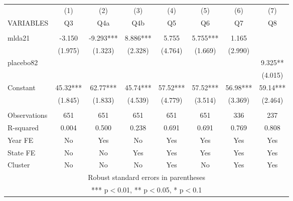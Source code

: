 \documentclass[]{article}
\begin{document}
\begin{tabular}{lccccccc} \hline
 & (1) & (2) & (3) & (4) & (5) & (6) & (7) \\
VARIABLES & Q3 & Q4a & Q4b & Q5 & Q6 & Q7 & Q8 \\ \hline
 &  &  &  &  &  &  &  \\
mlda21 & -3.150 & -9.293*** & 8.886*** & 5.755 & 5.755*** & 1.165 &  \\
 & (1.975) & (1.323) & (2.328) & (4.764) & (1.669) & (2.990) &  \\
placebo82 &  &  &  &  &  &  & 9.325** \\
 &  &  &  &  &  &  & (4.015) \\
Constant & 45.32*** & 62.77*** & 45.74*** & 57.52*** & 57.52*** & 56.98*** & 59.14*** \\
 & (1.845) & (1.833) & (4.539) & (4.779) & (3.514) & (3.369) & (2.464) \\
 &  &  &  &  &  &  &  \\
Observations & 651 & 651 & 651 & 651 & 651 & 336 & 237 \\
R-squared & 0.004 & 0.500 & 0.238 & 0.691 & 0.691 & 0.769 & 0.808 \\
Year FE & No & Yes & No & Yes & Yes & Yes & Yes \\
State FE & No & No & Yes & Yes & Yes & Yes & Yes \\
 Cluster & No & No & No & Yes & No & Yes & Yes \\ \hline
\multicolumn{8}{c}{ Robust standard errors in parentheses} \\
\multicolumn{8}{c}{ *** p$<$0.01, ** p$<$0.05, * p$<$0.1} \\
\end{tabular}
\end{document}
